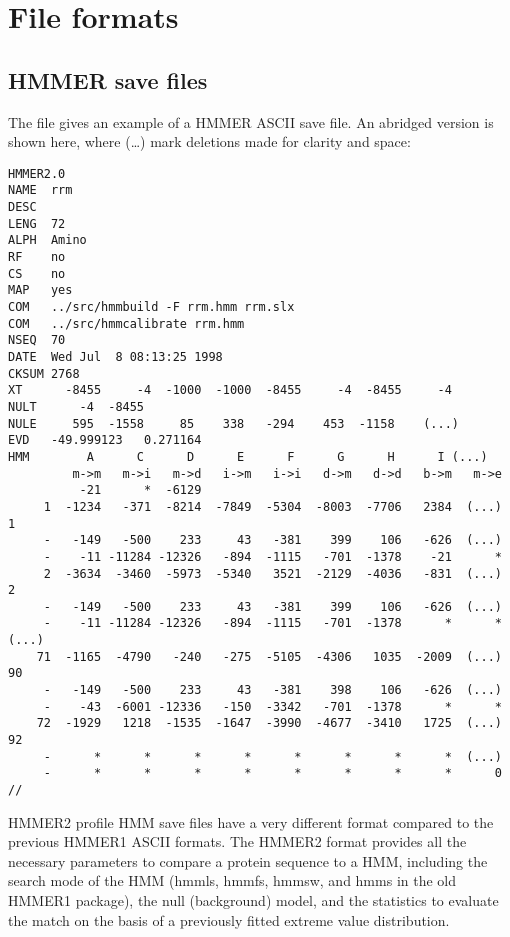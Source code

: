 \chapter{File formats}

\section{HMMER save files}

The file  gives an example of a HMMER ASCII save
file. An abridged version is shown here, where (\ldots) mark deletions
made for clarity and space:

{\small\begin{verbatim}
HMMER2.0
NAME  rrm
DESC  
LENG  72
ALPH  Amino
RF    no
CS    no
MAP   yes
COM   ../src/hmmbuild -F rrm.hmm rrm.slx
COM   ../src/hmmcalibrate rrm.hmm
NSEQ  70
DATE  Wed Jul  8 08:13:25 1998
CKSUM 2768
XT      -8455     -4  -1000  -1000  -8455     -4  -8455     -4 
NULT      -4  -8455
NULE     595  -1558     85    338   -294    453  -1158    (...)
EVD   -49.999123   0.271164
HMM        A      C      D      E      F      G      H      I (...)
         m->m   m->i   m->d   i->m   i->i   d->m   d->d   b->m   m->e
          -21      *  -6129
     1  -1234   -371  -8214  -7849  -5304  -8003  -7706   2384  (...) 1
     -   -149   -500    233     43   -381    399    106   -626  (...)
     -    -11 -11284 -12326   -894  -1115   -701  -1378    -21      * 
     2  -3634  -3460  -5973  -5340   3521  -2129  -4036   -831  (...) 2
     -   -149   -500    233     43   -381    399    106   -626  (...)
     -    -11 -11284 -12326   -894  -1115   -701  -1378      *      * 
(...)
    71  -1165  -4790   -240   -275  -5105  -4306   1035  -2009  (...) 90
     -   -149   -500    233     43   -381    398    106   -626  (...)
     -    -43  -6001 -12336   -150  -3342   -701  -1378      *      * 
    72  -1929   1218  -1535  -1647  -3990  -4677  -3410   1725  (...) 92
     -      *      *      *      *      *      *      *      *  (...) 
     -      *      *      *      *      *      *      *      *      0 
//
\end{verbatim}}

HMMER2 profile HMM save files have a very different format compared to
the previous HMMER1 ASCII formats. The HMMER2 format provides all the
necessary parameters to compare a protein sequence to a HMM, including
the search mode of the HMM (hmmls, hmmfs, hmmsw, and hmms in the old
HMMER1 package), the null (background) model, and the statistics to
evaluate the match on the basis of a previously fitted extreme value
distribution.

